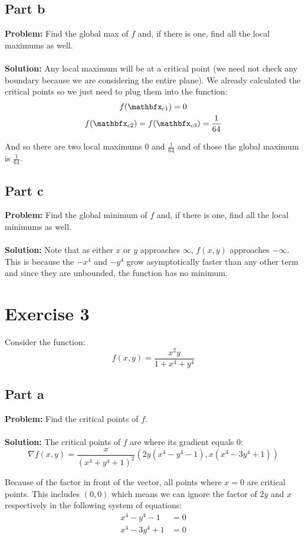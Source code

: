 \documentclass{article}
\begin{document}
\subsection*{Part b}
\textbf{Problem:} Find the global max of $f$ and, if there is one, find all the local maximums as well.
\\\\
\textbf{Solution:} Any local maximum will be at a critical point (we need not check any boundary because we are considering the entire plane). We already calculated the critical points so we just need to plug them into the function:
\begin{gather*}
  f(\mathbfx_{c1})=0\\
  f(\mathbfx_{c2})=f(\mathbfx_{c3})=\frac{1}{64}
\end{gather*}

And so there are two local maximums 0 and $\frac{1}{64}$ and of those the global maximum is $\frac{1}{64}$.

\subsection*{Part c}
\textbf{Problem:} Find the global minimum of $f$ and, if there is one, find all the local minimums as well.
\\\\
\textbf{Solution:} Note that as either $x$ or $y$ approaches $\infty$, $f(x,y)$ approaches $-\infty$. This is because the $-x^4$ and $-y^4$ grow asymptotically faster than any other term and since they are unbounded, the function has no minimum.

\section*{Exercise 3}
Consider the function:
$$f(x,y)=\frac{x^2y}{1+x^4+y^4}$$

\subsection*{Part a}
\textbf{Problem:} Find the critical points of $f$.
\\\\
\textbf{Solution:} The critical points of $f$ are where its gradient equals 0:
$$\nabla f(x,y)=\frac{x}{(x^4+y^4+1)^2}(2y(x^4-y^4-1),x(x^4-3y^4+1))$$

Because of the factor in front of the vector, all points where $x=0$ are critical points. This includes $(0,0)$ which means we can ignore the factor of $2y$ and $x$ respectively in the following system of equations:
\begin{align*}
x^4-y^4-1&=0\\
x^4-3y^4+1&=0
\end{align*}
\end{document}
